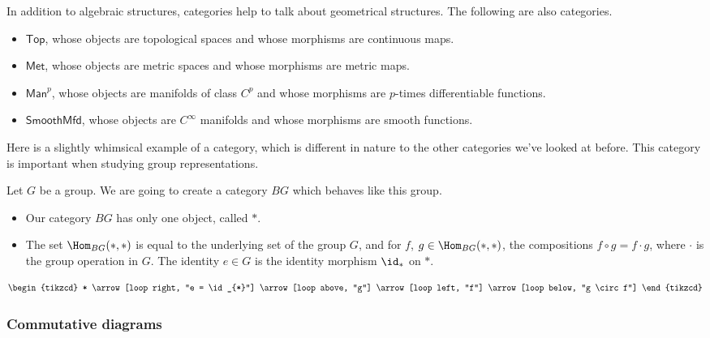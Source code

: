 \documentclass[notes.tex]{subfiles}
\begin{document}
\begin{example}
  \label{eg:moreexamplesofcategories}
  In addition to algebraic structures, categories help to talk about geometrical structures. The following are also categories.
  \begin{itemize}
    \item $\mathsf{Top}$, whose objects are topological spaces and whose morphisms are continuous maps.
    \item $\mathsf{Met}$, whose objects are metric spaces and whose morphisms are metric maps.
    \item $\mathsf{Man}^{p}$, whose objects are manifolds of class $C^{p}$ and whose morphisms are $p$-times differentiable functions.

    \item $\mathsf{SmoothMfd}$, whose objects are $C^{\infty}$ manifolds and whose morphisms are smooth functions.
  \end{itemize}
\end{example}

\begin{example}
  \label{eg:groupsaregroupoidswithoneobject}
  Here is a slightly whimsical example of a category, which is different in nature to the other categories we've looked at before. This category is important when studying group representations.

  Let $G$ be a group. We are going to create a category $BG$ which behaves like this group.
  \begin{itemize}
    \item Our category $BG$ has only one object, called $*$.

    \item The set $\Hom_{BG}(*, *)$ is equal to the underlying set of the group $G$, and for $f$, $g \in \Hom_{BG}(*, *)$, the compositions $f \circ g = f\cdot g$, where $\cdot$ is the group operation in $G$. The identity $e \in G$ is the identity morphism $\id_{*}$ on $*$.
  \end{itemize}
  \begin{equation*}
    \begin{tikzcd}
      *
      \arrow[loop right, "e = \id_{*}"]
      \arrow[loop above, "g"]
      \arrow[loop left, "f"]
      \arrow[loop below, "g \circ f"]
    \end{tikzcd}
  \end{equation*}
\end{example}


\subsubsection{Commutative diagrams}\label{sss:commutative_diagrams}
\end{document}
